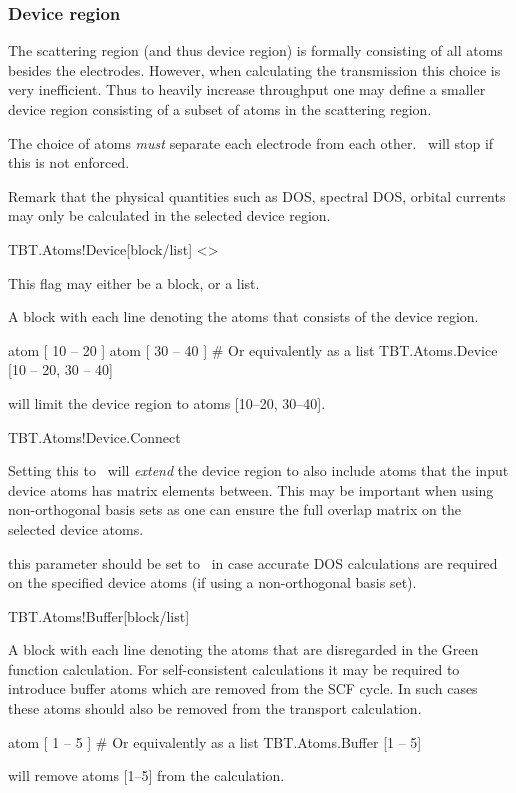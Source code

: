 \subsubsection{Device region} 

The scattering region (and thus device region) is formally consisting
of all atoms besides the electrodes. However, when calculating the
transmission this choice is very inefficient. Thus to heavily increase
throughput one may define a smaller device region consisting of a
subset of atoms in the scattering region.

The choice of atoms \emph{must} separate each electrode from each
other. \tbtrans\ will stop if this is not enforced.

Remark that the physical quantities such as DOS, spectral DOS, orbital
currents may only be calculated in the selected device region. 

\begin{fdfentry}{TBT.Atoms!Device}[block/list]%
  <>

  This flag may either be a block, or a list.

  A block with each line denoting the atoms that consists of the
  device region.
  \begin{fdfexample}
       atom [ 10 -- 20 ]
       atom [ 30 -- 40 ]
    # Or equivalently as a list   
    TBT.Atoms.Device [10 -- 20, 30 -- 40]
  \end{fdfexample}
  will limit the device region to atoms [10--20, 30--40].
  
\end{fdfentry}

\begin{fdflogicalF}{TBT.Atoms!Device.Connect}

  Setting this to \fdftrue\ will \emph{extend} the device region to
  also include atoms that the input device atoms has matrix
  elements between. This may be important when using non-orthogonal
  basis sets as one can ensure the full overlap matrix on the selected
  device atoms.
  
  \note this parameter should be set to \fdftrue\ in case accurate DOS
  calculations are required on the specified device atoms (if using a
  non-orthogonal basis set).

\end{fdflogicalF}

\begin{fdfentry}{TBT.Atoms!Buffer}[block/list]%

  A block with each line denoting the atoms that are disregarded in
  the Green function calculation.
  For self-consistent calculations it may be required to introduce
  buffer atoms which are removed from the SCF cycle. In such cases
  these atoms should also be removed from the transport calculation.
  \begin{fdfexample}
       atom [ 1 -- 5 ]
    # Or equivalently as a list   
    TBT.Atoms.Buffer [1 -- 5]
  \end{fdfexample}
  will remove atoms [1--5] from the calculation.
  
\end{fdfentry}



